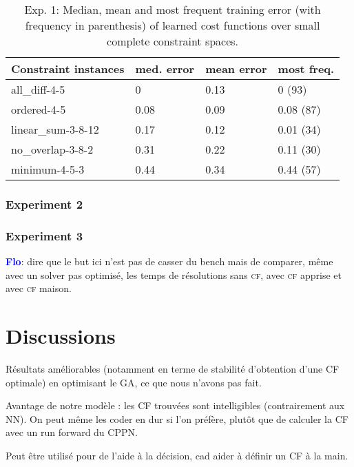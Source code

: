 \documentclass{article}
\newcommand{\cf}{\textsc{cf}\xspace}
\newcommand{\flo}{\textcolor{blue}{\bf Flo}\xspace}
\begin{document}

\begin{table}
\centering
\begin{tabular}{|l|l|l|l|}
\hline
  Constraint instances & med. error & mean error & most freq.\\
  \hline
all\_diff-4-5 & 0 & 0.13 & 0 (93)\\
ordered-4-5 & 0.08 & 0.09 & 0.08 (87)\\
linear\_sum-3-8-12 & 0.17 & 0.12 & 0.01 (34)\\
no\_overlap-3-8-2 & 0.31 & 0.22 & 0.11 (30)\\
minimum-4-5-3 & 0.44 & 0.34 & 0.44 (57)\\
\hline
\end{tabular}
\caption{Exp. 1: Median, mean and most frequent training error (with
  frequency  in  parenthesis) of  learned  cost  functions over  small
  complete constraint spaces.}
\label{tab:cf_small}
\end{table}



\subsubsection{Experiment 2}

\subsubsection{Experiment 3}
\flo:  dire que  le but  ici  n'est pas  de  casser du  bench mais  de
comparer, même avec un solver  pas optimisé, les temps de résolutions
sans \cf, avec \cf apprise et avec \cf maison.

\section{Discussions}

Résultats améliorables  (notamment en  terme de  stabilité d'obtention
d'une CF optimale) en optimisant le GA, ce que nous n'avons pas fait.

Avantage  de  notre  modèle  :  les  CF  trouvées  sont  intelligibles
(contrairement aux NN). On peut même les coder en dur si l'on préfère,
plutôt que de calculer la CF avec un run forward du CPPN.

Peut être utilisé pour de l'aide à la décision, cad aider à définir un
CF à la main.
\end{document}
